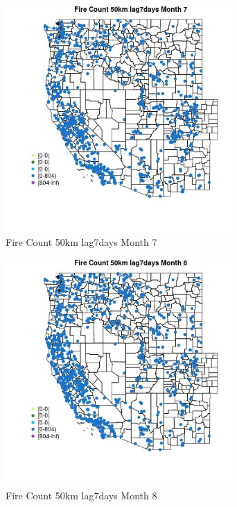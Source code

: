 \begin{figure} 
\centering  
\includegraphics[width=0.77\textwidth]{Code_Outputs/Report_ML_input_PM25_Step4_part_f_de_duplicated_aves_prioritize_24hr_obswNAs_MapObsMo7Fire_Count_50km_lag7days.jpg} 
\caption{\label{fig:Report_ML_input_PM25_Step4_part_f_de_duplicated_aves_prioritize_24hr_obswNAsMapObsMo7Fire_Count_50km_lag7days}Fire Count 50km lag7days Month 7} 
\end{figure} 
 

\begin{figure} 
\centering  
\includegraphics[width=0.77\textwidth]{Code_Outputs/Report_ML_input_PM25_Step4_part_f_de_duplicated_aves_prioritize_24hr_obswNAs_MapObsMo8Fire_Count_50km_lag7days.jpg} 
\caption{\label{fig:Report_ML_input_PM25_Step4_part_f_de_duplicated_aves_prioritize_24hr_obswNAsMapObsMo8Fire_Count_50km_lag7days}Fire Count 50km lag7days Month 8} 
\end{figure} 
 


